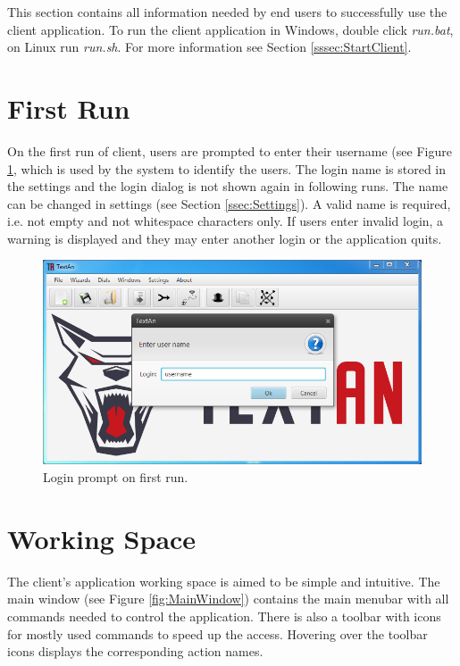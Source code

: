 This section contains all information needed by end users to successfully use
the \textan{} client application. To run the client application in Windows, double click \emph{run.bat}, on Linux run \emph{run.sh}. For more information
see Section \ref{sssec:StartClient}.

\section{First Run}

On the first run of \textan{} client, users are prompted to enter their username
(see Figure \ref{fig:Login}, which is used by the system to identify the users.
The login name is stored in the settings and the login dialog is not shown again
in following runs. The name can be changed in settings (see Section
\ref{ssec:Settings}). A valid name is required, i.e. not empty and not
whitespace characters only. If users enter invalid login, a warning is displayed
and they may enter another login or the application quits.

\begin{figure}[!htb]
        \centering
        \includegraphics[width=\textwidth]{Images/login}
        \caption{Login prompt on first run.}
        \label{fig:Login}
\end{figure}

\section{Working Space}

The \textan{} client's application working space is aimed to be simple and
intuitive. The main window (see Figure \ref{fig:MainWindow}) contains the main
menubar with all commands needed to control the application. There is also a
toolbar with icons for mostly used commands to speed up the access. Hovering
over the toolbar icons displays the corresponding action names.

